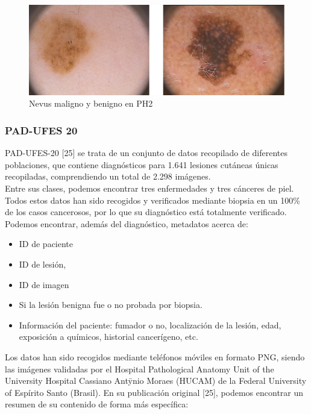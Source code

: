 \begin{figure}[H]
	\centering
	\includegraphics[scale = 0.6]{imagenes/PH2.png}
	\caption{Nevus maligno y benigno en PH2}
\end{figure}

\subsubsection{PAD-UFES 20}

PAD-UFES-20 [25] se trata de un conjunto de datos recopilado de diferentes poblaciones, que contiene diagnósticos para 1.641 lesiones cutáneas únicas recopiladas, comprendiendo un total de 2.298 imágenes.\\

Entre sus clases, podemos encontrar tres enfermedades y tres cánceres de piel.  Todos estos datos han sido recogidos y verificados mediante biopsia en un 100\% de los casos cancerosos, por lo que su diagnóstico está totalmente verificado.\\

Podemos encontrar, además del diagnóstico, metadatos acerca de:
\begin{itemize}
	\item ID de paciente
	\item ID de lesión, 
	\item ID de imagen
	\item Si la lesión benigna fue o no probada por biopsia.
	\item Información del paciente: fumador o no, localización de la lesión, edad, exposición a químicos, historial cancerígeno, etc.
\end{itemize}
Los datos han sido recogidos mediante teléfonos móviles en formato PNG, siendo las imágenes validadas por el Hospital Pathological Anatomy Unit of the University Hospital Cassiano Antȳnio Moraes (HUCAM) de la Federal University of Espírito Santo (Brasil). 
En su publicación original [25], podemos encontrar un resumen de su contenido de forma más específica:


